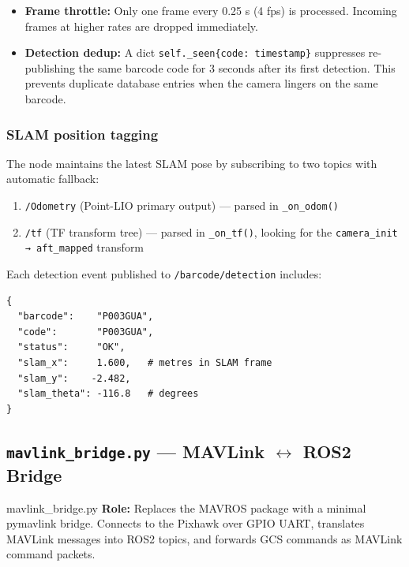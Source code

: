 \documentclass[11pt,a4paper]{article}
\begin{document}
\begin{itemize}
  \item \textbf{Frame throttle:} Only one frame every 0.25 s (4 fps) is
        processed. Incoming frames at higher rates are dropped immediately.
  \item \textbf{Detection dedup:} A dict \texttt{self.\_seen\{code: timestamp\}}
        suppresses re-publishing the same barcode code for 3 seconds after its
        first detection. This prevents duplicate database entries when the
        camera lingers on the same barcode.
\end{itemize}

\subsubsection{SLAM position tagging}

The node maintains the latest SLAM pose by subscribing to two topics with
automatic fallback:

\begin{enumerate}
  \item \texttt{/Odometry} (Point-LIO primary output) — parsed in
        \texttt{\_on\_odom()}
  \item \texttt{/tf} (TF transform tree) — parsed in \texttt{\_on\_tf()},
        looking for the \texttt{camera\_init → aft\_mapped} transform
\end{enumerate}

Each detection event published to \texttt{/barcode/detection} includes:
\begin{lstlisting}[style=python, caption=Detection event JSON payload]
{
  "barcode":    "P003GUA",
  "code":       "P003GUA",
  "status":     "OK",
  "slam_x":     1.600,   # metres in SLAM frame
  "slam_y":    -2.482,
  "slam_theta": -116.8   # degrees
}
\end{lstlisting}

\subsection{\texttt{mavlink\_bridge.py} — MAVLink $\leftrightarrow$ ROS2 Bridge}

\begin{filebox}{mavlink\_bridge.py}
\textbf{Role:} Replaces the MAVROS package with a minimal pymavlink bridge.
Connects to the Pixhawk over GPIO UART, translates MAVLink messages into
ROS2 topics, and forwards GCS commands as MAVLink command packets.
\end{filebox}
\end{document}
